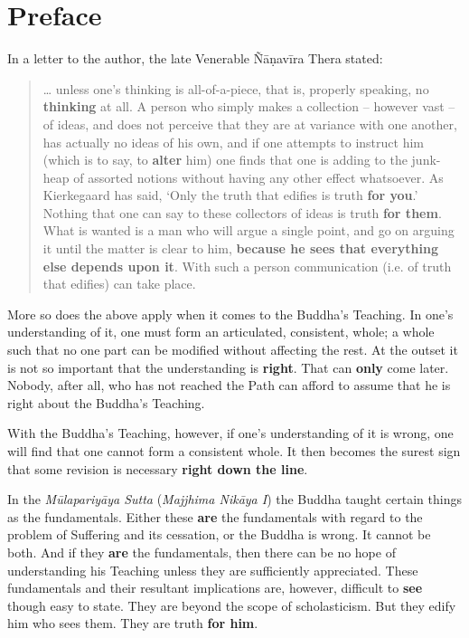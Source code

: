 \chapter{Preface}

In a letter to the author, the late Venerable Ñāṇavīra Thera stated:

\begin{quote}
\ldots{} unless one's thinking is all-of-a-piece, that is, properly speaking, no \textbf{thinking} at all. A person who simply makes a collection -- however vast -- of ideas, and does not perceive that they are at variance with one another, has actually no ideas of his own, and if one attempts to instruct him (which is to say, to \textbf{alter} him) one finds that one is adding to the junk-heap of assorted notions without having any other effect whatsoever. As Kierkegaard has said, `Only the truth that edifies is truth \textbf{for you}.' Nothing that one can say to these collectors of ideas is truth \textbf{for them}. What is wanted is a man who will argue a single point, and go on arguing it until the matter is clear to him, \textbf{because he sees that everything else depends upon it}. With such a person communication (i.e. of truth that edifies) can take place.
\end{quote}

More so does the above apply when it comes to the Buddha's Teaching. In one's understanding of it, one must form an articulated, consistent, whole; a whole such that no one part can be modified without affecting the rest. At the outset it is not so important that the understanding is \textbf{right}. That can \textbf{only} come later. Nobody, after all, who has not reached the Path can afford to assume that he is right about the Buddha's Teaching.

With the Buddha's Teaching, however, if one's understanding of it is wrong, one will find that one cannot form a consistent whole. It then becomes the surest sign that some revision is necessary \textbf{right down the line}.

In the \emph{Mūlapariyāya Sutta} (\emph{Majjhima Nikāya I}) the Buddha taught certain things as the fundamentals. Either these \textbf{are} the fundamentals with regard to the problem of Suffering and its cessation, or the Buddha is wrong. It cannot be both. And if they \textbf{are} the fundamentals, then there can be no hope of understanding his Teaching unless they are sufficiently appreciated. These fundamentals and their resultant implications are, however, difficult to \textbf{see} though easy to state. They are beyond the scope of scholasticism. But they edify him who sees them. They are truth \textbf{for him}.


